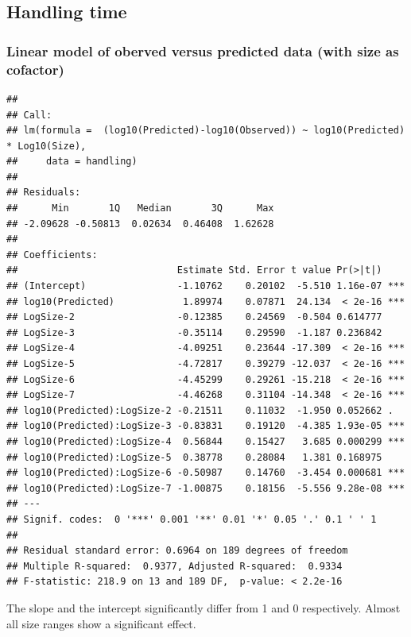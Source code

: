 \documentclass[utf8, 12 pt]{frontiers_suppmat}
\begin{document}
\hypertarget{handling-time}{%
\subsection{Handling time}\label{handling-time}}

\hypertarget{linear-model-of-oberved-versus-predicted-data-with-size-as-cofactor-1}{%
\subsubsection{Linear model of oberved versus predicted data (with size
as
cofactor)}\label{linear-model-of-oberved-versus-predicted-data-with-size-as-cofactor-1}}

\begin{verbatim}
## 
## Call:
## lm(formula =  (log10(Predicted)-log10(Observed)) ~ log10(Predicted) * Log10(Size), 
##     data = handling)
## 
## Residuals:
##      Min       1Q   Median       3Q      Max 
## -2.09628 -0.50813  0.02634  0.46408  1.62628 
## 
## Coefficients:
##                            Estimate Std. Error t value Pr(>|t|)    
## (Intercept)                -1.10762    0.20102  -5.510 1.16e-07 ***
## log10(Predicted)            1.89974    0.07871  24.134  < 2e-16 ***
## LogSize-2                  -0.12385    0.24569  -0.504 0.614777    
## LogSize-3                  -0.35114    0.29590  -1.187 0.236842    
## LogSize-4                  -4.09251    0.23644 -17.309  < 2e-16 ***
## LogSize-5                  -4.72817    0.39279 -12.037  < 2e-16 ***
## LogSize-6                  -4.45299    0.29261 -15.218  < 2e-16 ***
## LogSize-7                  -4.46268    0.31104 -14.348  < 2e-16 ***
## log10(Predicted):LogSize-2 -0.21511    0.11032  -1.950 0.052662 .  
## log10(Predicted):LogSize-3 -0.83831    0.19120  -4.385 1.93e-05 ***
## log10(Predicted):LogSize-4  0.56844    0.15427   3.685 0.000299 ***
## log10(Predicted):LogSize-5  0.38778    0.28084   1.381 0.168975    
## log10(Predicted):LogSize-6 -0.50987    0.14760  -3.454 0.000681 ***
## log10(Predicted):LogSize-7 -1.00875    0.18156  -5.556 9.28e-08 ***
## ---
## Signif. codes:  0 '***' 0.001 '**' 0.01 '*' 0.05 '.' 0.1 ' ' 1
## 
## Residual standard error: 0.6964 on 189 degrees of freedom
## Multiple R-squared:  0.9377, Adjusted R-squared:  0.9334 
## F-statistic: 218.9 on 13 and 189 DF,  p-value: < 2.2e-16
\end{verbatim}
The slope and the intercept significantly differ from 1 and 0
respectively. Almost all size ranges show a significant effect.
\par
\vspace{0.3 cm}
\end{document}
